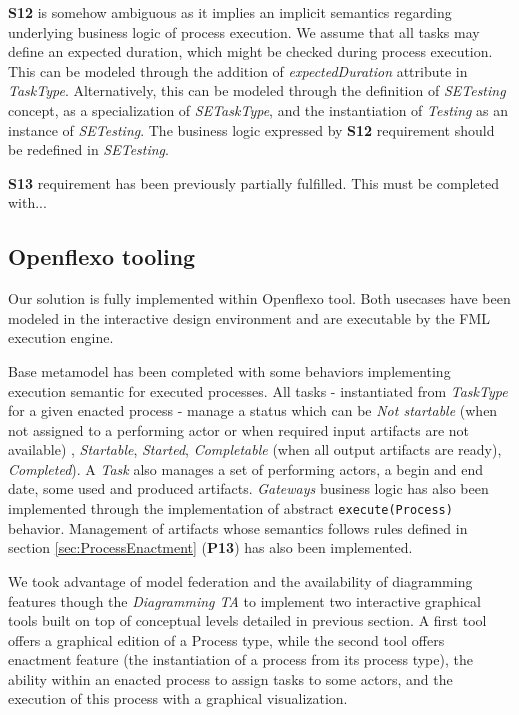 \textbf{S12} is somehow ambiguous as it implies an implicit semantics regarding underlying business logic of process execution. We assume that all tasks may define an expected duration, which might be checked during process execution. This can be modeled through the addition of \textit{expectedDuration} attribute in \textit{TaskType}. Alternatively, this can be modeled through the definition of \textit{SETesting} concept, as a specialization of \textit{SETaskType}, and the instantiation of \textit{Testing} as an instance of \textit{SETesting}. The business logic expressed by \textbf{S12} requirement should be redefined in \textit{SETesting}.

\textbf{S13} requirement has been previously partially fulfilled. This must be completed with...


\subsection{Openflexo tooling}
\label{subsec:tooling}

Our solution is fully implemented within Openflexo tool. Both usecases have been modeled in the interactive design environment and are executable by the FML execution engine.

Base metamodel has been completed with some behaviors implementing execution semantic for executed processes. All tasks - instantiated from \textit{TaskType} for a given enacted process - manage a status which can be \textit{Not startable} (when not assigned to a performing actor or when required input artifacts are not available) , \textit{Startable}, \textit{Started}, \textit{Completable} (when all output artifacts are ready), \textit{Completed}). A \textit{Task} also manages a set of performing actors, a begin and end date, some used and produced artifacts. \textit{Gateways} business logic has also been implemented through the implementation of abstract \texttt{execute(Process)} behavior. Management of artifacts whose semantics follows rules defined in section \ref{sec:ProcessEnactment} (\textbf{P13}) has also been implemented.

We took advantage of model federation and the availability of diagramming features though the \textit{Diagramming TA} to implement two interactive graphical tools built on top of conceptual levels detailed in previous section. A first tool offers a graphical edition of a Process type, while the second tool offers enactment feature (the instantiation of a process from its process type), the ability within an enacted process to assign tasks to some actors, and the execution of this process with a graphical visualization.

